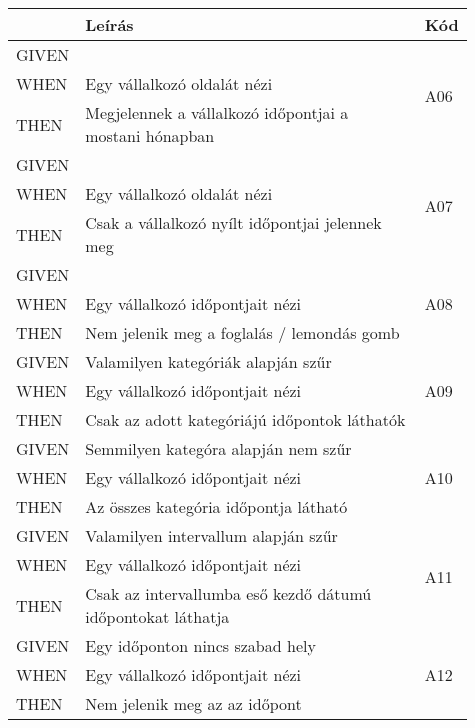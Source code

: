 \begin{table}[H]
	\centering
	\begin{tabular}{|m{0.1\linewidth}|m{0.75\linewidth}|m{0.06\linewidth}|}
		\hline
		& \textbf{Leírás} & \textbf{Kód} \\
		\hline
		GIVEN &  & \multirow{3}{*}{A06} \\ \cline{1-2}
		WHEN  & Egy vállalkozó oldalát nézi & \\ \cline{1-2}
		THEN  & Megjelennek a vállalkozó időpontjai a mostani hónapban & \\ 
		\hline
		GIVEN &  & \multirow{3}{*}{A07} \\ \cline{1-2}
		WHEN  & Egy vállalkozó oldalát nézi & \\ \cline{1-2}
		THEN  & Csak a vállalkozó nyílt időpontjai jelennek meg & \\ 
		\hline
		GIVEN &  & \multirow{3}{*}{A08} \\ \cline{1-2}
		WHEN  & Egy vállalkozó időpontjait nézi & \\ \cline{1-2}
		THEN  & Nem jelenik meg a foglalás / lemondás gomb & \\ 
		\hline
		GIVEN & Valamilyen kategóriák alapján szűr & \multirow{3}{*}{A09} \\ \cline{1-2}
		WHEN  & Egy vállalkozó időpontjait nézi & \\ \cline{1-2}
		THEN  & Csak az adott kategóriájú időpontok láthatók & \\ 
		\hline
		GIVEN & Semmilyen kategóra alapján nem szűr & \multirow{3}{*}{A10} \\ \cline{1-2}
		WHEN  & Egy vállalkozó időpontjait nézi & \\ \cline{1-2}
		THEN  & Az összes kategória időpontja látható & \\ 
		\hline
		GIVEN & Valamilyen intervallum alapján szűr & \multirow{3}{*}{A11} \\ \cline{1-2}
		WHEN  & Egy vállalkozó időpontjait nézi & \\ \cline{1-2}
		THEN  & Csak az intervallumba eső kezdő dátumú időpontokat láthatja & \\ 
		\hline
		GIVEN & Egy időponton nincs szabad hely & \multirow{3}{*}{A12} \\ \cline{1-2}
		WHEN  & Egy vállalkozó időpontjait nézi & \\ \cline{1-2}
		THEN  & Nem jelenik meg az az időpont & \\ 
		\hline
	\end{tabular}
\end{table}

